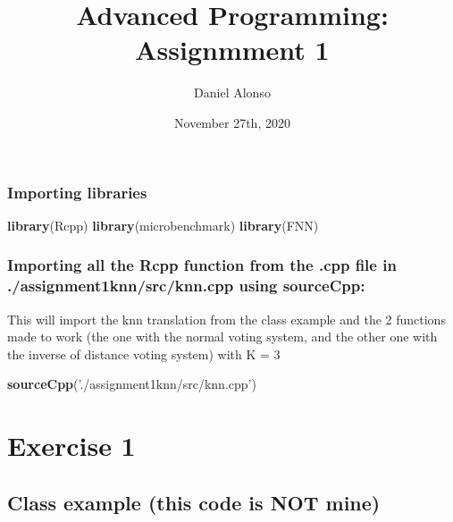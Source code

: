 \documentclass[]{article}
\title{Advanced Programming: Assignmment 1}
\author{Daniel Alonso}
\date{November 27th, 2020}
\newenvironment{Shaded}{\begin{snugshade}}{\end{snugshade}}
\newcommand{\KeywordTok}[1]{\textcolor[rgb]{0.13,0.29,0.53}{\textbf{#1}}}
\newcommand{\NormalTok}[1]{#1}
\newcommand{\StringTok}[1]{\textcolor[rgb]{0.31,0.60,0.02}{#1}}
\begin{document}
\maketitle

\hypertarget{importing-libraries}{%
\subsubsection{Importing libraries}\label{importing-libraries}}

\begin{Shaded}
\begin{Highlighting}[]
\KeywordTok{library}\NormalTok{(Rcpp)}
\KeywordTok{library}\NormalTok{(microbenchmark)}
\KeywordTok{library}\NormalTok{(FNN)}
\end{Highlighting}
\end{Shaded}

\hypertarget{importing-all-the-rcpp-function-from-the-.cpp-file-in-.assignment1knnsrcknn.cpp-using-sourcecpp}{%
\subsubsection{Importing all the Rcpp function from the .cpp file in
./assignment1knn/src/knn.cpp using
sourceCpp:}\label{importing-all-the-rcpp-function-from-the-.cpp-file-in-.assignment1knnsrcknn.cpp-using-sourcecpp}}

This will import the knn translation from the class example and the 2
functions made to work (the one with the normal voting system, and the
other one with the inverse of distance voting system) with K = 3

\begin{Shaded}
\begin{Highlighting}[]
\KeywordTok{sourceCpp}\NormalTok{(}\StringTok{'./assignment1knn/src/knn.cpp'}\NormalTok{)}
\end{Highlighting}
\end{Shaded}

\hypertarget{exercise-1}{%
\section{Exercise 1}\label{exercise-1}}

\hypertarget{class-example-this-code-is-not-mine}{%
\subsection{Class example (this code is NOT
mine)}\label{class-example-this-code-is-not-mine}}
\end{document}
